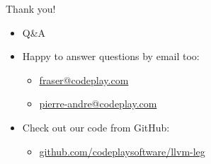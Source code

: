 \documentclass[t]{beamer}
\begin{document}

\begin{frame}{Thank you!}

\begin{itemize}
    \item Q\&A
    \item Happy to answer questions by email too:
    \begin{itemize}
        \item \url{fraser@codeplay.com}
        \item \url{pierre-andre@codeplay.com}
    \end{itemize}
    \item Check out our code from GitHub:
    \begin{itemize}
        \item \url{github.com/codeplaysoftware/llvm-leg}
    \end{itemize}
\end{itemize}

\end{frame}

\end{document}
